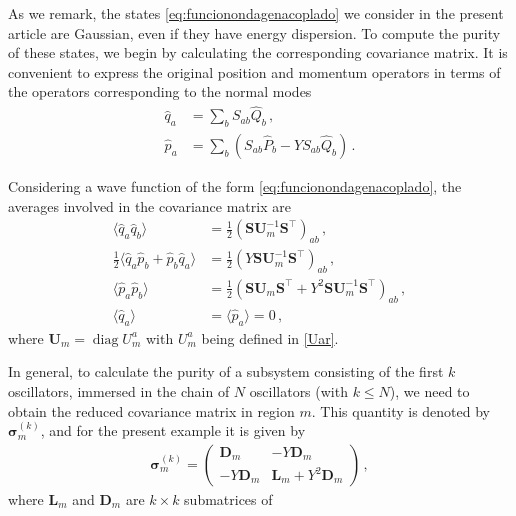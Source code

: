 \documentclass[12pt]{iopart}
\begin{document}
As we remark, the states \eqref{eq:funcionondagenacoplado}  we consider in the present article are Gaussian, even if they have energy dispersion. To compute the purity of these states, we begin by calculating the corresponding covariance matrix. It is convenient to express the original position and momentum operators in terms of the operators corresponding to the normal modes
\begin{subequations}\label{covarianzagen}
\begin{align}
\hat{q}_a& =\sum_b S_{ab} \hat{Q}_b\,,\\
\hat{p}_a&=\sum_b \left(S_{ab}\hat{P}_b-Y S_{ab}\hat{Q}_b\right)\,.
\end{align}
\end{subequations}

Considering a wave function of the form \eqref{eq:funcionondagenacoplado}, the averages involved in the covariance matrix are
\begin{subequations}\label{promedios}
\begin{align}
\langle \hat{q}_a \hat{q}_b \rangle&= \tfrac{1}{2}\left(\boldsymbol{S} \boldsymbol{U}^{-1}_m\boldsymbol{S}^{\intercal} \right)_{ab}\,,\\
\frac{1}{2}\langle \hat{q}_a \hat{p}_b+\hat{p}_b \hat{q}_a \rangle&= \tfrac{1}{2}\left(Y \boldsymbol{S} \boldsymbol{U}^{-1}_{m}\boldsymbol{S}^{\intercal}\right)_{ab}\,,\\
\langle \hat{p}_a \hat{p}_b \rangle&= \tfrac{1}{2}\left(\boldsymbol{S}\boldsymbol{U}_m\boldsymbol{ S}^{\intercal} + Y^2\boldsymbol{S} \boldsymbol{U}^{-1}_m\boldsymbol{S}^{\intercal} \right)_{ab}\,, \label{18c}\\
\langle \hat{q}_a \rangle&= \langle \hat{p}_a \rangle=0\,,
\end{align}
\end{subequations}
where $ \boldsymbol{U}_m=\operatorname{diag} U^a_m$ with $U^a_m$ being defined in \eqref{Uar}. 

In general, to calculate the purity of a subsystem consisting of the first $k$ oscillators, immersed in the chain of $N$ oscillators (with $k \leq N$), we need to obtain the reduced covariance matrix in region $m$. This quantity is denoted by $\boldsymbol{ \sigma}^{(k)}_{m}$, and for the present example it is given by
\begin{align}\label{redcovex2}
\boldsymbol{ \sigma}^{(k)}_{m}=\left(\begin{array}{cc} \boldsymbol{D}_m & -Y\boldsymbol{D}_m  \\- Y\boldsymbol{D}_m & \boldsymbol{L}_m+Y^2 \boldsymbol{D}_m\end{array}\right)\,,
\end{align}
where $\boldsymbol{L}_m$ and $\boldsymbol{D}_m$ are $k\times k$ submatrices of 
\end{document}
